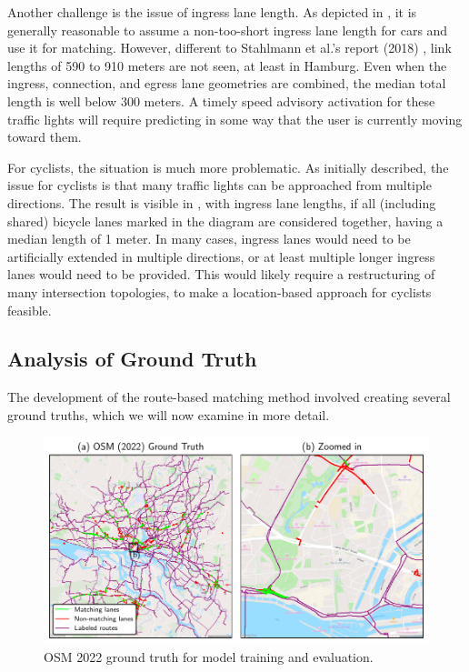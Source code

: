 Another challenge is the issue of ingress lane length. As depicted in , it is generally reasonable to assume a non-too-short ingress lane length for cars and use it for matching. However, different to Stahlmann et al.'s report (2018) \cite{stahlmann_exploring_2018}, link lengths of 590 to 910 meters are not seen, at least in Hamburg. Even when the ingress, connection, and egress lane geometries are combined, the median total length is well below 300 meters. A timely speed advisory activation for these traffic lights will require predicting in some way that the user is currently moving toward them.

For cyclists, the situation is much more problematic. As initially described, the issue for cyclists is that many traffic lights can be approached from multiple directions. The result is visible in , with ingress lane lengths, if all (including shared) bicycle lanes marked in the diagram are considered together, having a median length of 1 meter. In many cases, ingress lanes would need to be artificially extended in multiple directions, or at least multiple longer ingress lanes would need to be provided. This would likely require a restructuring of many intersection topologies, to make a location-based approach for cyclists feasible.

\subsection{Analysis of Ground Truth}

The development of the route-based matching method involved creating several ground truths, which we will now examine in more detail.

\begin{figure}[t]
\centering 
\includegraphics[width=\linewidth]{images/matching-ground-truth-osm-old.pdf}
\caption{OSM 2022 ground truth for model training and evaluation.}
\label{fig:matching-ground-truth-osm-old}
\end{figure}

